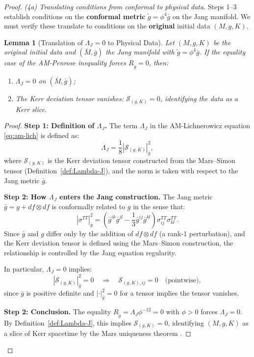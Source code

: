 \documentclass[12pt]{article}
\theoremstyle{plain}
\newtheorem{lemma}[theorem]{Lemma}
\theoremstyle{definition}
\theoremstyle{remark}
\newcommand{\tg}{\tilde{g}}
\newcommand{\bg}{\bar{g}}
\newcommand{\bM}{\bar{M}}
\begin{document}
\begin{proof}
\textit{(4a) Translating conditions from conformal to physical data.}
Steps 1--3 establish conditions on the \textbf{conformal metric} $\tg = \phi^4 \bg$ on the Jang manifold. We must verify these translate to conditions on the \textbf{original} initial data $(M, g, K)$.

\begin{lemma}[Translation of $\Lambda_J = 0$ to Physical Data]\label{lem:lambda-translation}
Let $(M, g, K)$ be the original initial data and $(\bM, \bg)$ the Jang manifold with $\tg = \phi^4\bg$. If the equality case of the AM-Penrose inequality forces $R_{\tg} = 0$, then:
\begin{enumerate}
    \item $\Lambda_J = 0$ on $(\bM, \bg)$;
    \item The Kerr deviation tensor vanishes: $\mathcal{S}_{(g,K)} = 0$, identifying the data as a Kerr slice.
\end{enumerate}
\end{lemma}

\begin{proof}
\textbf{Step 1: Definition of $\Lambda_J$.}
The term $\Lambda_J$ in the AM-Lichnerowicz equation \eqref{eq:am-lich} is defined as:
\[
\Lambda_J = \frac{1}{8}|\mathcal{S}_{(g,K)}|_{\bg}^2,
\]
where $\mathcal{S}_{(g,K)}$ is the Kerr deviation tensor constructed from the Mars--Simon tensor (Definition~\ref{def:Lambda-J}), and the norm is taken with respect to the Jang metric $\bg$.

\textbf{Step 2: How $\Lambda_J$ enters the Jang construction.}
The Jang metric $\bg = g + df \otimes df$ is conformally related to $g$ in the sense that:
\[
|\sigma^{TT}|_{\bg}^2 = (\bg^{ik}\bg^{jl} - \frac{1}{3}\bg^{ij}\bg^{kl})\sigma^{TT}_{ij}\sigma^{TT}_{kl}.
\]
Since $\bg$ and $g$ differ only by the addition of $df \otimes df$ (a rank-1 perturbation), and the Kerr deviation tensor is defined using the Mars--Simon construction, the relationship is controlled by the Jang equation regularity.

In particular, $\Lambda_J = 0$ implies:
\[
|\mathcal{S}_{(g,K)}|_{\bg}^2 = 0 \quad \Rightarrow \quad \mathcal{S}_{(g,K),ij} = 0 \quad \text{(pointwise)},
\]
since $\bg$ is positive definite and $|\cdot|_{\bg}^2 = 0$ for a tensor implies the tensor vanishes.

\textbf{Step 2: Conclusion.}
The equality $R_{\tg} = \Lambda_J \phi^{-12} = 0$ with $\phi > 0$ forces $\Lambda_J = 0$. By Definition~\ref{def:Lambda-J}, this implies $\mathcal{S}_{(g,K)} = 0$, identifying $(M, g, K)$ as a slice of Kerr spacetime by the Mars uniqueness theorem \cite{mars2009}.
\end{proof}


\end{proof}
\end{document}
